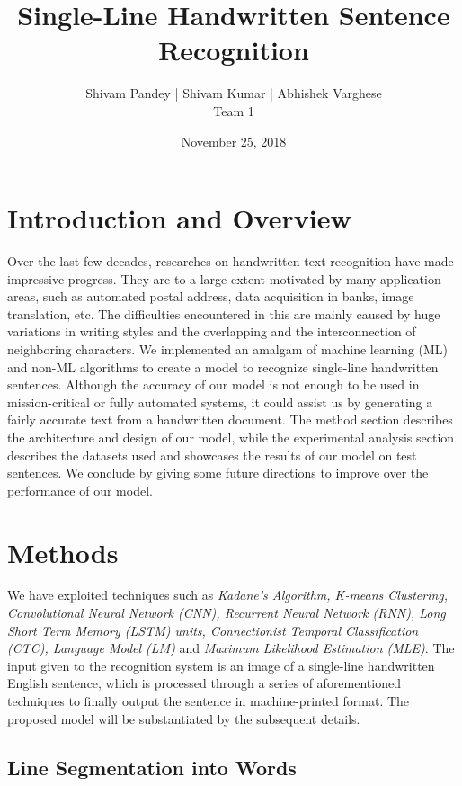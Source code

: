 \documentclass[a4paper, 10pt,twocolumn]{article}
\begin{document}
	
\title{Single-Line Handwritten Sentence Recognition}
\author{Shivam Pandey | Shivam Kumar | Abhishek Varghese\\Team 1} 
\date{November 25, 2018}

\maketitle


 
\section{Introduction and Overview}
Over the last few decades, researches on handwritten text recognition have made impressive progress. They are to a large extent motivated by many application areas, such as automated postal address, data acquisition in banks, image translation, etc. The difficulties encountered in this are mainly caused by huge variations in writing styles and the overlapping and the interconnection of neighboring characters. We implemented an amalgam of machine learning (ML) and non-ML algorithms to create a model to recognize single-line handwritten sentences. Although the accuracy of our model is not enough to be used in mission-critical or fully automated systems, it could assist us by generating a fairly accurate text from a handwritten document. The method section describes the architecture and design of our model, while the experimental analysis section describes the datasets used and showcases the results of our model on test sentences. We conclude by giving some future directions to improve over the performance of our model.

\section{Methods}
We have exploited techniques such as \emph{Kadane's Algorithm, K-means Clustering, Convolutional Neural Network (CNN), Recurrent Neural Network (RNN), Long Short Term Memory (LSTM) units, Connectionist Temporal Classification (CTC), Language Model (LM)} and \emph{Maximum Likelihood Estimation (MLE)}. The input given to the recognition system is an image of a single-line handwritten English sentence, which is processed through a series of aforementioned techniques to finally output the sentence in machine-printed format. The proposed model will be substantiated by the subsequent details.

\subsection*{Line Segmentation into Words}
\end{document}
